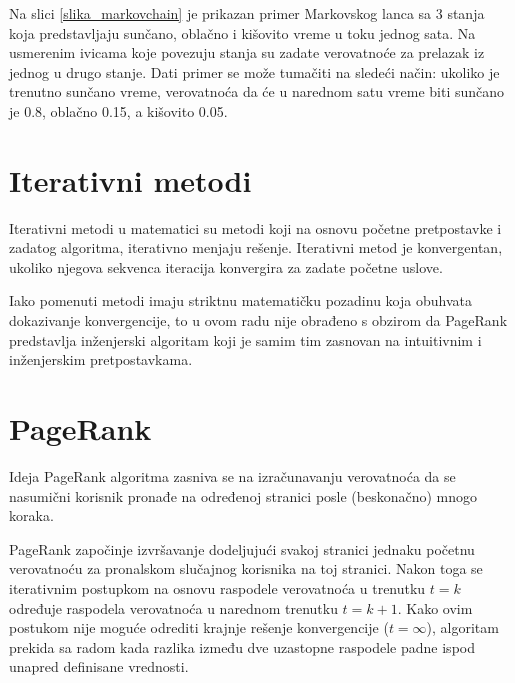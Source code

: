 \documentclass[12pt, journal, compsoc]{IEEEtran}
\begin{document}
Na slici \ref{slika_markovchain} je prikazan primer Markovskog lanca sa 3 stanja koja predstavljaju sunčano, oblačno i kišovito vreme u toku jednog sata. Na usmerenim ivicama koje povezuju stanja su zadate verovatnoće za prelazak iz jednog u drugo stanje. Dati primer se može tumačiti na sledeći način: ukoliko je trenutno sunčano vreme, verovatnoća da će u narednom satu vreme biti sunčano je 0.8, oblačno 0.15, a kišovito 0.05. 

\begin{figure}[h]
\end{figure}
\section{Iterativni metodi}
Iterativni metodi u matematici su metodi koji na osnovu početne pretpostavke i zadatog algoritma, iterativno menjaju rešenje. Iterativni metod je konvergentan, ukoliko njegova sekvenca iteracija konvergira za zadate početne uslove.

Iako pomenuti metodi imaju striktnu matematičku pozadinu koja obuhvata dokazivanje konvergencije, to u ovom radu nije obrađeno s obzirom da PageRank predstavlja inženjerski algoritam koji je samim tim zasnovan na intuitivnim i inženjerskim pretpostavkama.

\section{PageRank}
Ideja PageRank algoritma zasniva se na izračunavanju verovatnoća da se nasumični korisnik pronađe na određenoj stranici posle (beskonačno) mnogo koraka.

PageRank započinje izvršavanje dodeljujući svakoj stranici jednaku početnu verovatnoću za pronalskom slučajnog korisnika na toj stranici. Nakon toga se iterativnim postupkom na osnovu raspodele verovatnoća u trenutku $t = k$ određuje raspodela verovatnoća u narednom trenutku $t = k+1$. Kako ovim postukom nije moguće odrediti krajnje rešenje konvergencije ($t = \infty$), algoritam prekida sa radom kada razlika između dve uzastopne raspodele padne ispod unapred definisane vrednosti.
\end{document}
